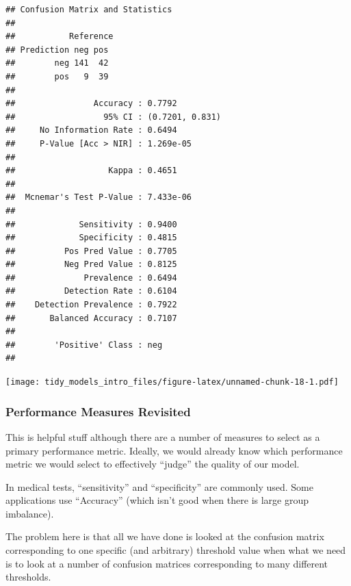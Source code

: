 \documentclass[
]{article}
\newenvironment{Shaded}{\begin{snugshade}}{\end{snugshade}}
\newcommand{\FunctionTok}[1]{\textcolor[rgb]{0.00,0.00,0.00}{#1}}
\newcommand{\NormalTok}[1]{#1}
\newcommand{\SpecialCharTok}[1]{\textcolor[rgb]{0.00,0.00,0.00}{#1}}
\begin{document}
\begin{verbatim}
## Confusion Matrix and Statistics
## 
##           Reference
## Prediction neg pos
##        neg 141  42
##        pos   9  39
##                                          
##                Accuracy : 0.7792         
##                  95% CI : (0.7201, 0.831)
##     No Information Rate : 0.6494         
##     P-Value [Acc > NIR] : 1.269e-05      
##                                          
##                   Kappa : 0.4651         
##                                          
##  Mcnemar's Test P-Value : 7.433e-06      
##                                          
##             Sensitivity : 0.9400         
##             Specificity : 0.4815         
##          Pos Pred Value : 0.7705         
##          Neg Pred Value : 0.8125         
##              Prevalence : 0.6494         
##          Detection Rate : 0.6104         
##    Detection Prevalence : 0.7922         
##       Balanced Accuracy : 0.7107         
##                                          
##        'Positive' Class : neg            
## 
\end{verbatim}

\begin{Shaded}
\end{Shaded}

\texttt{[image: tidy\_models\_intro\_files/figure-latex/unnamed-chunk-18-1.pdf]}

\hypertarget{performance-measures-revisited}{%
\subsubsection{Performance Measures
Revisited}\label{performance-measures-revisited}}

This is helpful stuff although there are a number of measures to select
as a primary performance metric. Ideally, we would already know which
performance metric we would select to effectively ``judge'' the quality
of our model.

In medical tests, ``sensitivity'' and ``specificity'' are commonly used.
Some applications use ``Accuracy'' (which isn't good when there is large
group imbalance).

The problem here is that all we have done is looked at the confusion
matrix corresponding to one specific (and arbitrary) threshold value
when what we need is to look at a number of confusion matrices
corresponding to many different thresholds.
\end{document}
